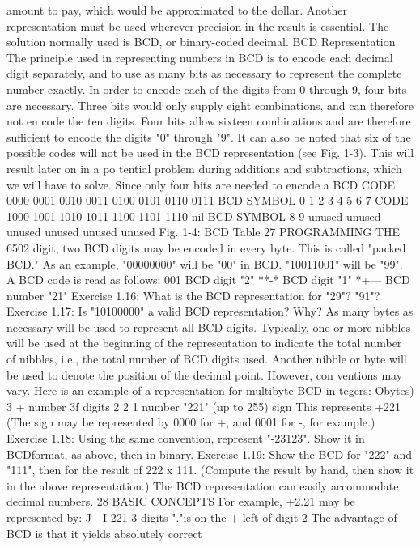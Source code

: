 \documentclass{book}
\begin{document}
amount to pay, which would be approximated to the dollar.
Another representation must be used wherever precision in the
result is essential. The solution normally used is BCD, or
binary-coded decimal.
BCD Representation
The principle used in representing numbers in BCD is to encode
each decimal digit separately, and to use as many bits as necessary
to represent the complete number exactly. In order to encode each
of the digits from 0 through 9, four bits are necessary. Three bits
would only supply eight combinations, and can therefore not en
code the ten digits. Four bits allow sixteen combinations and are
therefore sufficient to encode the digits "0" through "9". It can
also be noted that six of the possible codes will not be used in the
BCD representation (see Fig. 1-3). This will result later on in a po
tential problem during additions and subtractions, which we will
have to solve. Since only four bits are needed to encode a BCD
CODE
0000
0001
0010
0011
0100
0101
0110
0111
BCD
SYMBOL
0
1
2
3
4
5
6
7
CODE
1000
1001
1010
1011
1100
1101
1110
nil
BCD
SYMBOL
8
9
unused
unused
unused
unused
unused
unused
Fig. 1-4: BCD Table
27
PROGRAMMING THE 6502
digit, two BCD digits may be encoded in every byte. This is called
"packed BCD."
As an example, "00000000" will be "00" in BCD. "10011001"
will be "99".
A BCD code is read as follows:
001
BCD digit "2" **-*
BCD digit "1" *+—
BCD number "21"
Exercise 1.16: What is the BCD representation for "29"? "91"?
Exercise 1.17: Is "10100000" a valid BCD representation? Why?
As many bytes as necessary will be used to represent all BCD
digits. Typically, one or more nibbles will be used at the beginning
of the representation to indicate the total number of nibbles, i.e.,
the total number of BCD digits used. Another nibble or byte will
be used to denote the position of the decimal point. However, con
ventions may vary.
Here is an example of a representation for multibyte BCD in
tegers:
Obytes) 3 +
number
3f digits
2 2 1
number "221"
(up to 255) sign
This represents +221
(The sign may be represented by 0000 for +, and 0001 for -, for
example.)
Exercise 1.18: Using the same convention, represent "-23123". Show
it in BCDformat, as above, then in binary.
Exercise 1.19: Show the BCD for "222" and "111", then for the result
of 222 x 111. (Compute the result by hand, then show it in the above
representation.)
The BCD representation can easily accommodate decimal
numbers.
28
BASIC CONCEPTS
For example, +2.21 may be represented by:
J~\ I 221
3 digits "."is on the +
left of digit 2
The advantage of BCD is that it yields absolutely correct
\end{document}
